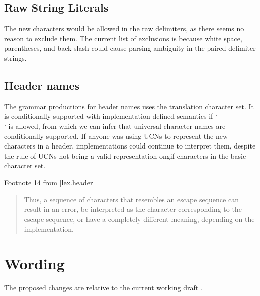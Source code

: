 \documentclass[a4paper,10pt,oneside,openany,final,article]{memoir}
\begin{document}
\section{Raw String Literals}
The new characters would be allowed in the raw delimiters, as there seems no reason to exclude them. The current list of exclusions is because white space, parentheses, and back slash could cause parsing ambiguity in the paired delimiter strings.

\section{Header names}
The grammar productions for header names uses the translation character set. It is conditionally supported with implementation defined semantics if `\\` is allowed, from which we can infer that universal character names are conditionally supported. If anyone was using UCNs to represent the new characters in a header, implementations could continue to interpret them, despite the rule of UCNs not being a valid representation ongif characters in the basic character set.

Footnote 14 from [lex.header]

\begin{quote}
Thus, a sequence of characters that resembles an escape sequence can result in an error, be interpreted as the character corresponding to the escape sequence, or have a completely different meaning, depending on the implementation.
\end{quote}


\chapter{Wording}

The proposed changes are relative to the current working draft \cite{@N4917}.
\end{document}
